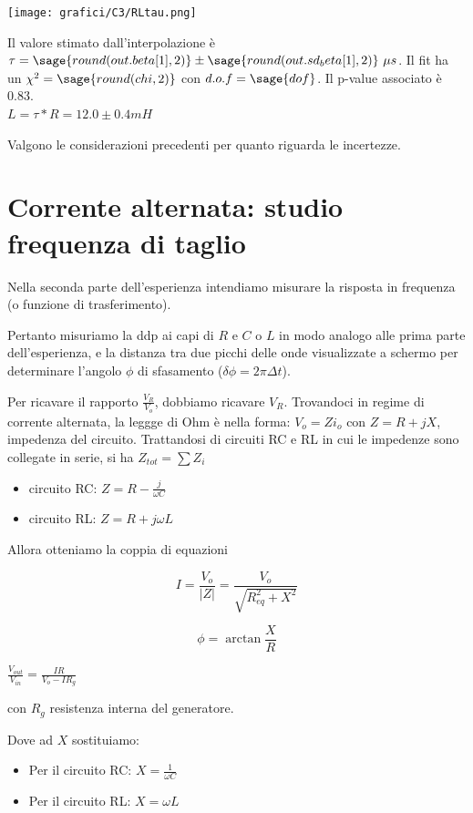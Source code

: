\begin{center}
 \texttt{[image: grafici/C3/RLtau.png]}
\end{center}

Il valore stimato dall'interpolazione è $\tau=\sage{round(out.beta[1],2)} \pm \sage{round(out.sd_beta[1],2)}\ \mu s$. Il fit ha un $\chi^2 = \sage{round(chi,2)} $ con $d.o.f= \sage{dof}$. Il p-value associato è $0.83$.
\\

$L = \tau*R = 12.0 \pm 0.4 mH$ 


Valgono le considerazioni precedenti per quanto riguarda le incertezze. 

\section{Corrente alternata: studio frequenza di taglio}

Nella seconda parte dell'esperienza intendiamo misurare la risposta in frequenza (o funzione di trasferimento).

Pertanto misuriamo la ddp ai capi di $R$ e $C$ o $L$ in modo analogo alle prima parte dell'esperienza, e la distanza tra due picchi delle onde visualizzate a schermo per determinare l'angolo $\phi$ di sfasamento ($\delta \phi = 2 \pi \Delta t$).

Per ricavare il rapporto $\frac{V_{R}}{V_{o}}$, dobbiamo ricavare $V_R$. Trovandoci in regime di corrente alternata, la leggge di Ohm è nella forma: $ V_o = Zi_o$ con $Z = R + jX$, impedenza del circuito.
Trattandosi di circuiti RC e RL in cui le impedenze sono collegate in serie, si ha $Z_{tot} = \sum Z_i$

\begin{itemize}
\item circuito RC: $Z=R-\frac{j}{\omega C}$
\item circuito RL: $Z=R+j\omega L$
\end{itemize}  

Allora otteniamo la coppia di equazioni 

$$I = \frac{V_o}{|Z|} = \frac{V_o}{\sqrt{R_{eq}^2+X^2}} $$ 

$$\phi = \arctan \frac{X}{R} $$


$\frac{V_{out }}{V_{in}} = \frac{IR}{V_o - IR_g}$

con $R_g$ resistenza interna del generatore. 

Dove ad $X$ sostituiamo:
\begin{itemize}
\item Per il circuito RC: $X=\frac{1}{\omega C}$
\item Per il circuito RL: $X=\omega L$
\end{itemize}

